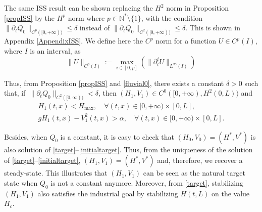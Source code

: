 \begin{rmk}
\label{rmkHpISS}
The same ISS result can be shown replacing the $H^{2}$ norm in Proposition \ref{propISS} by the $H^{p}$ norm where ${p\in\mathbb{N}^{*}\setminus\{1\}}$, with the condition $\lVert\partial_{t}Q_{0}\rVert_{C^{p}([0,+\infty))}\leq\delta$ instead of $\lVert\partial_{t}Q_{0}\rVert_{C^{2}([0,+\infty))}\leq\delta$. This is shown in Appendix \ref{AppendixISS}. {We define here the $C^{p}$ norm for a function $U\in C^{p}(I)$, where $I$ is an interval, as
\begin{equation*}
\rVert U \lVert_{C^{p}(I)}:=\max_{i\in[0,p]}(\lVert \partial_{t}^{i}U\rVert_{L^{\infty}(I)})
\end{equation*}}
\end{rmk}

Thus, from Proposition \ref{propISS} and \eqref{fluvial0}, there exists a constant ${\delta}>0$ such that, if~$\lVert\partial_{t}Q_{0}\rVert_{{C^{2}([0,\infty))}}<{\delta}$, then $(H_{1},V_{1})\in C^{0}([0,+\infty),H^{2}(0,L))$ and
\begin{gather}
H_{1}(t,x)<H_{\max},\quad\forall(t,x)\in[0,+\infty)\times[0,L],
\label{Hinfty}\\
gH_{1}(t,x)-V_{1}^{2}(t,x)>\alpha,\quad\forall (t,x)\in[0,+\infty)\times[0,L].
\label{fluvial}
\end{gather}

Besides, when $Q_{0}$ is a constant, it is easy to check that $(H_{0},V_{0})=(H^{*},V^{*})$ is also solution of \eqref{target}--\eqref{initialtarget}. Thus, from the uniqueness of the solution of \eqref{target}--\eqref{initialtarget},
$(H_{1},V_{1})=(H^{*},V^{*})$ and, therefore, we recover a steady-state.
This illustrates that $(H_{1},V_{1})$ can be seen as the natural target state
when $Q_{0}$ is not a constant anymore.
Moreover, from \eqref{target}, stabilizing $(H_{1},V_{1})$ also satisfies the industrial goal by stabilizing $H(t,L)$ on the value $H_{c}$.

